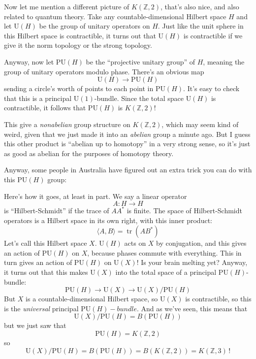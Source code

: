 \documentclass{article}
\def\tightlist{}
\renewcommand{\texttt}[1]{%
  \begingroup
  \ttfamily
  \begingroup\lccode`~=`/\lowercase{\endgroup\def~}{/\discretionary{}{}{}}%
  \begingroup\lccode`~=`[\lowercase{\endgroup\def~}{[\discretionary{}{}{}}%
  \begingroup\lccode`~=`.\lowercase{\endgroup\def~}{.\discretionary{}{}{}}%
  \catcode`/=\active\catcode`[=\active\catcode`.=\active
  \scantokens{#1\noexpand}%
  \endgroup
}
\begin{document}
Now let me mention a different picture of \(K(\mathbb{Z},2)\), that's
also nice, and also related to quantum theory. Take any
countable-dimensional Hilbert space \(H\) and let \(\mathrm{U}(H)\) be
the group of unitary operators on \(H\). Just like the unit sphere in
this Hilbert space is contractible, it turns out that \(\mathrm{U}(H)\)
is contractible if we give it the norm topology or the strong topology.

Anyway, now let \(\mathrm{PU}(H)\) be the ``projective unitary group''
of \(H\), meaning the group of unitary operators modulo phase. There's
an obvious map \[\mathrm{U}(H) \to \mathrm{PU}(H)\] sending a circle's
worth of points to each point in \(\mathrm{PU}(H)\). It's easy to check
that this is a principal \(\mathrm{U}(1)\)-bundle. Since the total space
\(\mathrm{U}(H)\) is contractible, it follows that \(\mathrm{PU}(H)\) is
\(K(\mathbb{Z},2)\)!

This give a \emph{nonabelian} group structure on \(K(\mathbb{Z},2)\),
which may seem kind of weird, given that we just made it into an
\emph{abelian} group a minute ago. But I guess this other product is
``abelian up to homotopy'' in a very strong sense, so it's just as good
as abelian for the purposes of homotopy theory.

Anyway, some people in Australia have figured out an extra trick you can
do with this \(\mathrm{PU}(H)\) group:


Here's how it goes, at least in part. We say a linear operator
\[A\colon  H \to  H\] is ``Hilbert-Schmidt'' if the trace of \(AA^*\) is
finite. The space of Hilbert-Schmidt operators is a Hilbert space in its
own right, with this inner product:
\[\langle A,B\rangle = \operatorname{tr}(AB^*)\] Let's call this Hilbert
space \(X\). \(\mathrm{U}(H)\) acts on \(X\) by conjugation, and this
gives an action of \(\mathrm{PU}(H)\) on \(X\), because phases commute
with everything. This in turn gives an action of \(\mathrm{PU}(H)\) on
\(\mathrm{U}(X)\)! Is your brain melting yet? Anyway, it turns out that
this makes \(\mathrm{U}(X)\) into the total space of a principal
\(\mathrm{PU}(H)\)-bundle:
\[\mathrm{PU}(H) \to \mathrm{U}(X) \to \mathrm{U}(X)/\mathrm{PU}(H)\]
But \(X\) is a countable-dimensional Hilbert space, so \(\mathrm{U}(X)\)
is contractible, so this is the \emph{universal} principal
\(\mathrm{PU}(H)-bundle\). And as we've seen, this means that
\[\mathrm{U}(X)/\mathrm{PU}(H) = B(\mathrm{PU}(H))\] but we just saw
that \[\mathrm{PU}(H) = K(\mathbb{Z},2)\] so
\[\mathrm{U}(X)/\mathrm{PU}(H) = B(\mathrm{PU}(H)) = B(K(\mathbb{Z},2)) = K(\mathbb{Z},3) \,\text{!}\]
\end{document}
